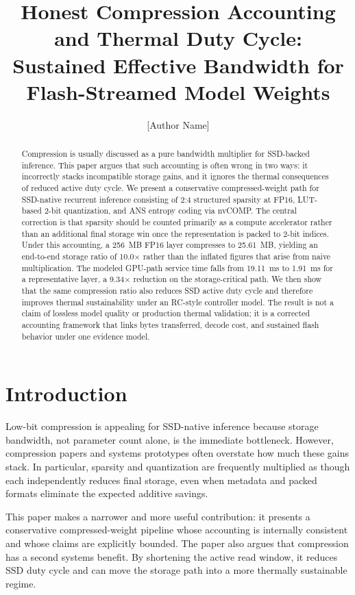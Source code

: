 \documentclass[11pt]{article}
\title{Honest Compression Accounting and Thermal Duty Cycle:\\Sustained Effective Bandwidth for Flash-Streamed Model Weights}
\author{[Author Name]}
\date{}
\begin{document}
\maketitle

\begin{abstract}
Compression is usually discussed as a pure bandwidth multiplier for SSD-backed inference. This paper argues that such accounting is often wrong in two ways: it incorrectly stacks incompatible storage gains, and it ignores the thermal consequences of reduced active duty cycle. We present a conservative compressed-weight path for SSD-native recurrent inference consisting of 2:4 structured sparsity at FP16, LUT-based 2-bit quantization, and ANS entropy coding via nvCOMP. The central correction is that sparsity should be counted primarily as a compute accelerator rather than an additional final storage win once the representation is packed to 2-bit indices. Under this accounting, a 256~MB FP16 layer compresses to 25.61~MB, yielding an end-to-end storage ratio of 10.0$\times$ rather than the inflated figures that arise from naive multiplication. The modeled GPU-path service time falls from 19.11~ms to 1.91~ms for a representative layer, a 9.34$\times$ reduction on the storage-critical path. We then show that the same compression ratio also reduces SSD active duty cycle and therefore improves thermal sustainability under an RC-style controller model. The result is not a claim of lossless model quality or production thermal validation; it is a corrected accounting framework that links bytes transferred, decode cost, and sustained flash behavior under one evidence model.
\end{abstract}

\section{Introduction}
Low-bit compression is appealing for SSD-native inference because storage bandwidth, not parameter count alone, is the immediate bottleneck. However, compression papers and systems prototypes often overstate how much these gains stack. In particular, sparsity and quantization are frequently multiplied as though each independently reduces final storage, even when metadata and packed formats eliminate the expected additive savings.

This paper makes a narrower and more useful contribution: it presents a conservative compressed-weight pipeline whose accounting is internally consistent and whose claims are explicitly bounded. The paper also argues that compression has a second systems benefit. By shortening the active read window, it reduces SSD duty cycle and can move the storage path into a more thermally sustainable regime.
\end{document}
